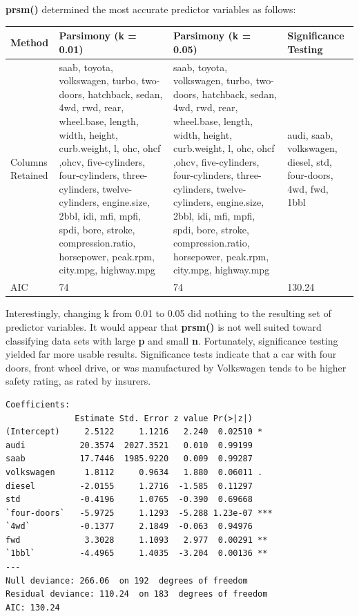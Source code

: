 \documentclass[letter]{article}
\begin{document}

\textbf{prsm()} determined the most accurate predictor variables as follows:\\
\begin{center}
    \begin{tabular}{ | l |  p{4cm} |  p{4cm} | p{4cm} |}
    \hline
    Method & Parsimony (k = 0.01) & Parsimony (k = 0.05) & Significance Testing \\ \hline
    	
    Columns Retained & saab, toyota, volkswagen, turbo, two-doors, hatchback, sedan, 4wd, rwd, rear, wheel.base, length, width, height, curb.weight, l, ohc, ohcf ,ohcv, five-cylinders, four-cylinders, three-cylinders, twelve-cylinders, engine.size, 2bbl, idi, mfi, mpfi, spdi, bore, stroke, compression.ratio, horsepower, peak.rpm, city.mpg, highway.mpg & saab, toyota, volkswagen, turbo, two-doors, hatchback, sedan, 4wd, rwd, rear, wheel.base, length, width, height, curb.weight, l, ohc, ohcf ,ohcv, five-cylinders, four-cylinders, three-cylinders, twelve-cylinders, engine.size, 2bbl, idi, mfi, mpfi, spdi, bore, stroke, compression.ratio, horsepower, peak.rpm, city.mpg, highway.mpg & audi, saab, volkswagen, diesel, std, four-doors, 4wd, fwd, 1bbl\\ \hline
    
    AIC & 74 & 74 & 130.24\\ \hline
    
    \end{tabular}
\end{center}

Interestingly, changing k from 0.01 to 0.05 did nothing to the resulting set of predictor variables.  It would appear that \textbf{prsm()} is not well suited toward classifying data sets with large \textbf{p} and small \textbf{n}.  Fortunately, significance testing yielded far more usable results.  Significance tests indicate that a car with four doors, front wheel drive, or was manufactured by Volkswagen tends to be higher safety rating, as rated by insurers.


\begin{verbatim}
Coefficients:
              Estimate Std. Error z value Pr(>|z|)    
(Intercept)     2.5122     1.1216   2.240  0.02510 *  
audi           20.3574  2027.3521   0.010  0.99199    
saab           17.7446  1985.9220   0.009  0.99287    
volkswagen      1.8112     0.9634   1.880  0.06011 .  
diesel         -2.0155     1.2716  -1.585  0.11297    
std            -0.4196     1.0765  -0.390  0.69668    
`four-doors`   -5.9725     1.1293  -5.288 1.23e-07 ***
`4wd`          -0.1377     2.1849  -0.063  0.94976    
fwd             3.3028     1.1093   2.977  0.00291 ** 
`1bbl`         -4.4965     1.4035  -3.204  0.00136 ** 
---
Null deviance: 266.06  on 192  degrees of freedom
Residual deviance: 110.24  on 183  degrees of freedom
AIC: 130.24

\end{verbatim}
\newpage
 
\end{document}

